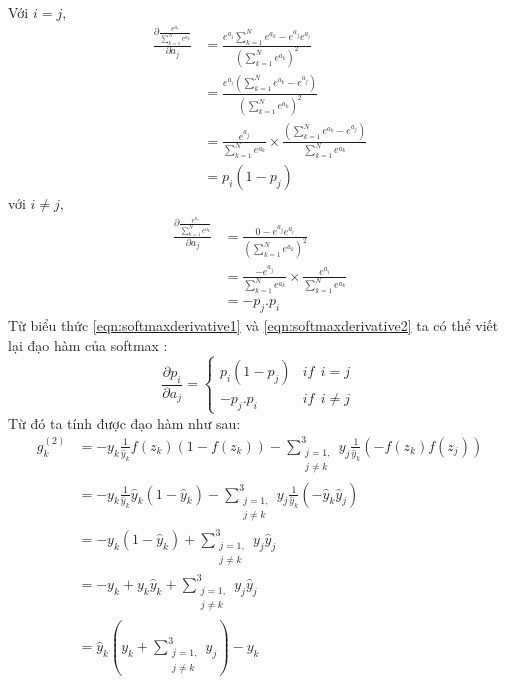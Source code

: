 Với $i=j$,
\begin{equation}
\label{eqn:softmaxderivative1}
\begin{split}
\frac{\partial  \frac{e^{a_i}}{\sum_{k=1}^N e^{a_k}}}{\partial a_j}&= \frac{e^{a_i} \sum_{k=1}^N e^{a_k} - e^{a_j}e^{a_i}}{\left( \sum_{k=1}^N e^{a_k}\right)^2} \\
&= \frac{e^{a_i} \left( \sum_{k=1}^N e^{a_k} - e^{a_j}\right )}{\left( \sum_{k=1}^N e^{a_k}\right)^2} \\
&= \frac{ e^{a_j} }{\sum_{k=1}^N e^{a_k} } \times \frac{\left( \sum_{k=1}^N e^{a_k} - e^{a_j}\right ) }{\sum_{k=1}^N e^{a_k} } \\
&= p_i(1-p_j)
\end{split}
\end{equation}
với $i \neq j$,
\begin{equation}
\label{eqn:softmaxderivative2}
\begin{split}
\frac{\partial  \frac{e^{a_i}}{\sum_{k=1}^N e^{a_k}}}{\partial a_j}&= \frac{0 - e^{a_j}e^{a_i}}{\left( \sum_{k=1}^N e^{a_k}\right)^2} \\
&= \frac{- e^{a_j} }{\sum_{k=1}^N e^{a_k} } \times \frac{e^{a_i} }{\sum_{k=1}^N e^{a_k} } \\
&= - p_j.p_i
\end{split}
\end{equation}
Từ biểu thức \ref{eqn:softmaxderivative1} và \ref{eqn:softmaxderivative2} ta có thể viết lại đạo hàm của softmax :\\
\begin{equation}
\frac{\partial p_i}{\partial a_j} = 
\begin{cases}
p_i(1-p_j) & if ~~i=j \\
-p_j.p_i & if ~~i \neq j\
\end{cases}
\end{equation}
Từ đó ta tính được đạo hàm như sau:
\begin{equation}
\begin{split}
g^{(2)}_k 
& = - y_k \frac{1}{\widehat{y}_k} f(z_k)(1-f(z_k))- \sum^{3}_{\substack{j=1,\\j \neq k}} y_j \frac{1}{\widehat{y}_k}(-f(z_k)f(z_j))\\
& = -y_k \frac{1}{\widehat{y}_k} \widehat{y}_k (1- \widehat{y}_k )- \sum^{3}_{\substack{j=1,\\j \neq k}} y_j \frac{1}{\widehat{y}_k}(-\widehat{y}_k \widehat{y}_j) \\
& = -y_k(1- \widehat{y}_k )+\sum^{3}_{\substack{j=1,\\j \neq k}} y_j \widehat{y}_j \\
& = -y_k + y_k\widehat{y}_k +\sum^{3}_{\substack{j=1,\\j \neq k}} y_j \widehat{y}_j\\
& = \widehat{y}_k ( y_k +\sum^{3}_{\substack{j=1,\\j \neq k}}y_j ) - y_k
\end{split}
\end{equation}
